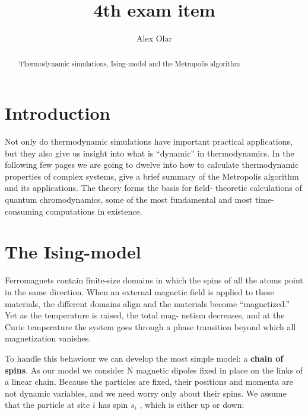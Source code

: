 \documentclass[12pt]{article}
\theoremstyle{plain}
\begin{document}
\title{4th exam item}
\author{Alex Olar}

\maketitle

\newpage
\begin{abstract}
    Thermodynamic simulations, Ising-model and the Metropolis algorithm
\end{abstract}

\vspace{2mm}

\section{Introduction}

\vspace{2mm}

\par Not only do thermodynamic simulations
have important practical applications, but they also give us insight into what is “dynamic” in
thermodynamics. In the following few pages we are going
to dwelve into how to calculate thermodynamic properties of
complex systems, give a brief summary of the Metropolis algorithm and its 
applications. The theory forms the basis for field- theoretic calculations
of quantum chromodynamics, some of the most fundamental and most time-consuming
computations in existence. \cite{landau}

\vspace{2mm}

\section{The Ising-model}

\vspace{2mm}

\par Ferromagnets contain finite-size domains in which the spins of all the atoms point in the same
direction. When an external magnetic field is applied to these materials, the different domains
align and the materials become “magnetized.” Yet as the temperature is raised, the total mag-
netism decreases, and at the Curie temperature the system goes through a phase transition
beyond which all magnetization vanishes.

\vspace{2mm}

\par To handle this behaviour we can develop the most simple model: a \textbf{chain of spins}. As our model
we consider N magnetic dipoles fixed in place on the links of a linear chain. Because
the particles are fixed, their positions and momenta are not dynamic variables, and we need
worry only about their spins. We assume that the particle at site $i$ has spin $s_{i}$ , which is either
up or down:
\end{document}
